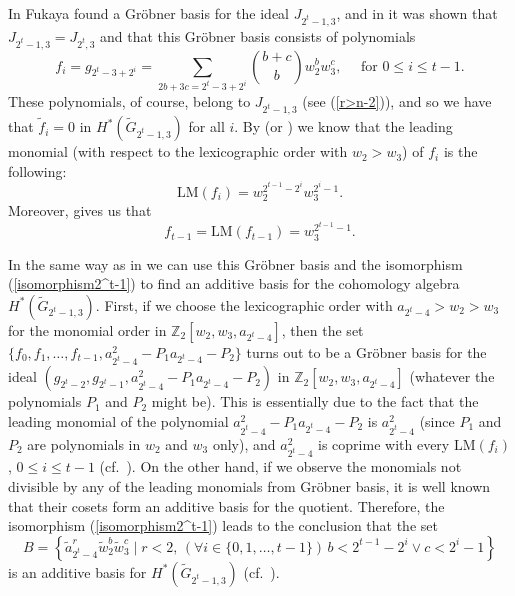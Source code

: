 \documentclass{amsart}
\theoremstyle{definition}
\theoremstyle{remark}
\numberwithin{equation}{section}
\begin{document}
In \cite{Fukaya} Fukaya found a Gr\"obner basis for the ideal $J_{2^t-1,3}$, and in \cite{CP} it was shown that $J_{2^t-1,3}=J_{2^t,3}$ and that this Gr\"obner basis consists of polynomials
\begin{equation}\label{grebnerova_baza}
    f_i=g_{2^t-3+2^i}=\sum_{2b+3c=2^t-3+2^i}{b+c\choose b}w_2^bw_3^c,\quad \mbox{ for } 0\le i\le t-1.
    \end{equation}
These polynomials, of course, belong to $J_{2^t-1,3}$ (see (\ref{r>n-2})), and so we have that $\widetilde f_i=0$ in $H^*(\widetilde G_{2^t-1,3})$ for all $i$. By \cite[p.\ 203]{Fukaya} (or \cite[Proposition 3.4]{CP}) we know that the leading monomial (with respect to the lexicographic order with $w_2>w_3$) of $f_i$ is the following:
\begin{equation}\label{LMfi}
\mathrm{LM}(f_i)=w_2^{2^{t-1}-2^i}w_3^{2^i-1}.
\end{equation}
Moreover, \cite[Proposition 3.4]{CP} gives us that
\begin{equation}\label{ft-1}
f_{t-1}=\mathrm{LM}(f_{t-1})=w_3^{2^{t-1}-1}.
\end{equation}

In the same way as in \cite{CP} we can use this Gr\"obner basis and the isomorphism (\ref{isomorphism2^t-1}) to find an additive basis for the cohomology algebra $H^*(\widetilde G_{2^t-1,3})$. First, if we choose the lexicographic order with $a_{2^t-4}>w_2>w_3$ for the monomial order in $\mathbb Z_2[w_2,w_3,a_{2^t-4}]$, then the set $\{f_0,f_1,\ldots,f_{t-1},a_{2^t-4}^2-P_1a_{2^t-4}-P_2\}$ turns out to be a Gr\"obner basis for the ideal $(g_{2^t-2},g_{2^t-1},a_{2^t-4}^2-P_1a_{2^t-4}-P_2)$ in $\mathbb Z_2[w_2,w_3,a_{2^t-4}]$ (whatever the polynomials $P_1$ and $P_2$ might be). This is essentially due to the fact that the leading monomial of the polynomial $a_{2^t-4}^2-P_1a_{2^t-4}-P_2$ is $a_{2^t-4}^2$ (since $P_1$ and $P_2$ are polynomials in $w_2$ and $w_3$ only), and $a_{2^t-4}^2$ is coprime with every $\mathrm{LM}(f_i)$, $0\le i\le t-1$ (cf.\ \cite[Theorem 3.6]{CP}). On the other hand, if we observe the monomials not divisible by any of the leading monomials from Gr\"obner basis, it is well known that their cosets form an additive basis for the quotient. Therefore, the isomorphism (\ref{isomorphism2^t-1}) leads to the conclusion that the set
\begin{equation}\label{aditivna_baza}
    B = \left\{\widetilde a_{2^t-4}^r \widetilde w_2^b \widetilde w_3^c \mid r<2,\, \left(\forall i\in\{0,1,\ldots,t-1\}\right)\, b<2^{t-1}-2^i \vee c<2^i-1\right\}\end{equation}
is an additive basis for $H^*(\widetilde G_{2^t-1,3})$ (cf.\ \cite[Corollary 3.6.1]{CP}).
\end{document}
